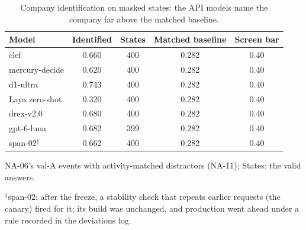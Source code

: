 \begin{table}[htbp]
\centering
\small
\begin{threeparttable}
\caption{Company identification on masked states: the API models name the company far above the matched baseline.}\label{tab:a-company-identification}
\begin{tabular}{@{}lS[table-format=1.3]S[table-format=3.0]S[table-format=1.3]S[table-format=1.2]@{}}
\toprule
Model & {Identified} & {States} & {Matched baseline} & {Screen bar} \\
\midrule
clef & 0.660 & 400 & 0.282 & 0.40 \\
mercury-decide & 0.620 & 400 & 0.282 & 0.40 \\
d1-ultra & 0.743 & 400 & 0.282 & 0.40 \\
Laya zero-shot & 0.320 & 400 & 0.282 & 0.40 \\
drex-v2.0 & 0.680 & 400 & 0.282 & 0.40 \\
gpt-6-luna & 0.682 & 399 & 0.282 & 0.40 \\
span-02$^{\ddagger}$ & 0.662 & 400 & 0.282 & 0.40 \\
\bottomrule
\end{tabular}
\begin{tablenotes}[flushleft]\footnotesize
\item NA-06's val-A events with activity-matched distractors (NA-11); States: the valid answers.
\item $^{\ddagger}$span-02: after the freeze, a stability check that repeats earlier requests (the canary) fired for it; its build was unchanged, and production went ahead under a rule recorded in the deviations log.
\end{tablenotes}
\end{threeparttable}
\end{table}
